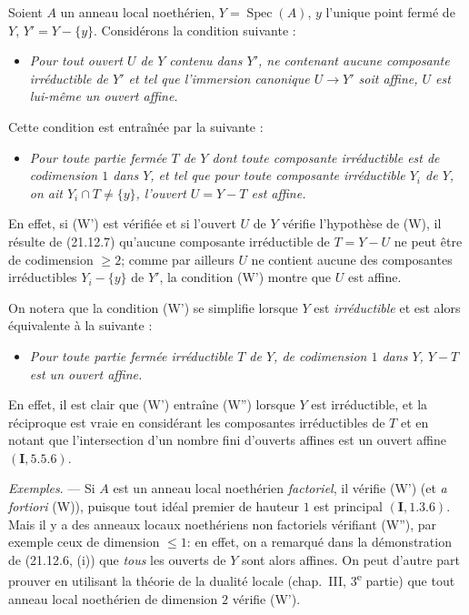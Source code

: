 \begin{env}[21.12.8]
\label{IV.21.12.8}
Soient $A$ un anneau local noethérien, $Y=\operatorname{Spec}(A)$, $y$ l'unique point
fermé de $Y$, $Y'=Y-\{y\}$. Considérons la condition suivante :
\begin{itemize}
  \item[\textup{(W)}] \emph{Pour tout ouvert $U$ de $Y$ contenu dans $Y'$, ne
  contenant aucune composante irréductible de $Y'$ et tel que l'immersion canonique
  $U\to Y'$ soit affine, $U$ est lui-même un ouvert affine.}
\end{itemize}
Cette condition est entraînée par la suivante :
\begin{itemize}
  \item[\textup{(W')}] \emph{Pour toute partie fermée $T$ de $Y$ dont toute composante
  irréductible est de codimension $1$ dans $Y$, et tel que pour toute composante
  irréductible $Y_i$ de $Y$, on ait $Y_i\cap T\ne\{y\}$, l'ouvert $U=Y-T$ est affine.}
\end{itemize}
En effet, si (W') est vérifiée et si l'ouvert $U$ de $Y$ vérifie l'hypothèse de (W), il
résulte de (21.12.7) qu'aucune composante irréductible de $T=Y-U$ ne peut être de
codimension $\geq2$; comme par ailleurs $U$ ne contient aucune des composantes
irréductibles $Y_i-\{y\}$ de $Y'$, la condition (W') montre que $U$ est affine.

On notera que la condition (W') se simplifie lorsque $Y$ est \emph{irréductible} et est
alors équivalente à la suivante :
\begin{itemize}
  \item[\textup{(W'')}] \emph{Pour toute partie fermée irréductible $T$ de $Y$, de
  codimension $1$ dans $Y$, $Y-T$ est un ouvert affine.}
\end{itemize}
En effet, il est clair que (W') entraîne (W'') lorsque $Y$ est irréductible, et la
réciproque est vraie en considérant les composantes irréductibles de $T$ et en notant
que l'intersection d'un nombre fini d'ouverts affines est un ouvert affine
$(\mathbf I, 5.5.6)$.
\end{env}

\begin{env}[21.12.9]
\label{IV.21.12.9}
\emph{Exemples}. ---
Si $A$ est un anneau local noethérien \emph{factoriel}, il vérifie (W') (et
\emph{a fortiori} (W)), puisque tout idéal premier de hauteur $1$ est principal
$(\mathbf I, 1.3.6)$. Mais il y a des anneaux locaux noethériens non factoriels
vérifiant (W''), par exemple ceux de dimension $\leq1$: en effet, on a remarqué dans la
démonstration de (21.12.6, (i)) que \emph{tous} les ouverts de $Y$ sont alors affines.
On peut d'autre part prouver en utilisant la théorie de la dualité locale (chap.~III,
3\textsuperscript{e} partie) que tout anneau local noethérien de dimension $2$ vérifie
(W').
\end{env}

